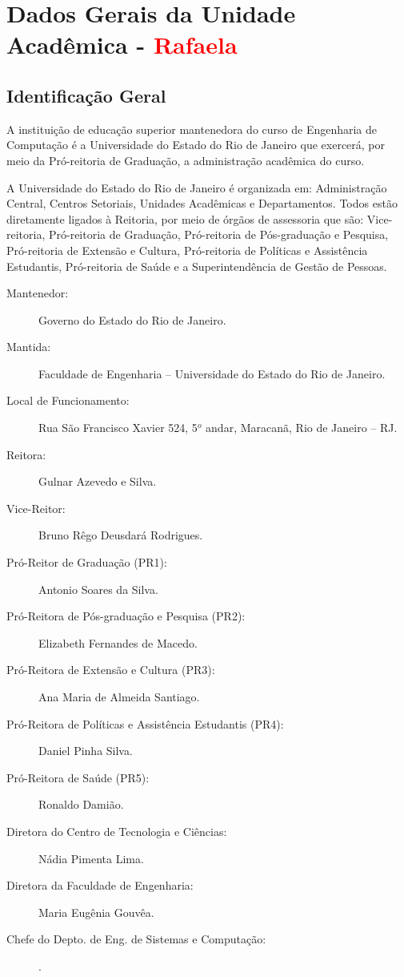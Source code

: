 \chapter{Dados Gerais da Unidade Acadêmica - \textcolor{red}{Rafaela}}


\section{Identificação Geral}

A instituição de educação superior mantenedora do curso de Engenharia de Computação é a Universidade do Estado do Rio de Janeiro que exercerá, por meio da Pró-reitoria de Graduação, a administração acadêmica do curso.

A Universidade do Estado do Rio de Janeiro é organizada em: Administração Central, Centros Setoriais, Unidades Acadêmicas e Departamentos. Todos estão diretamente ligados à Reitoria, por meio de órgãos de assessoria que são: Vice-reitoria, Pró-reitoria de Graduação, Pró-reitoria de Pós-graduação e Pesquisa, Pró-reitoria de Extensão e Cultura, Pró-reitoria de Políticas e Assistência Estudantis, Pró-reitoria de Saúde e a Superintendência de Gestão de Pessoas.


\begin{description}
	\item[Mantenedor:] Governo do Estado do Rio de Janeiro.
	\item [Mantida:] Faculdade de Engenharia -- Universidade do Estado do Rio de Janeiro.
	\item [Local de Funcionamento:] Rua São Francisco Xavier 524, 5$^{o}$ andar, Maracanã, Rio de Janeiro -- RJ.
	\item [Reitora:] Gulnar Azevedo e Silva.
	\item [Vice-Reitor:] Bruno Rêgo Deusdará Rodrigues.
	\item [Pró-Reitor de Graduação (PR1):] Antonio Soares da Silva.
	\item [Pró-Reitora de Pós-graduação e Pesquisa (PR2):] Elizabeth Fernandes de Macedo.
	\item [Pró-Reitora de Extensão e Cultura (PR3):] Ana Maria de Almeida Santiago.
	\item [Pró-Reitora de Políticas e Assistência Estudantis (PR4):] Daniel Pinha Silva.
	\item [Pró-Reitora de Saúde (PR5):] Ronaldo Damião.
	\item [Diretora do Centro de Tecnologia e Ciências:] Nádia Pimenta Lima.
	\item [Diretora da Faculdade de Engenharia:]  Maria Eugênia Gouvêa.
	\item [Chefe do Depto. de Eng. de Sistemas e Computação:]  \araujo.
\end{description}

